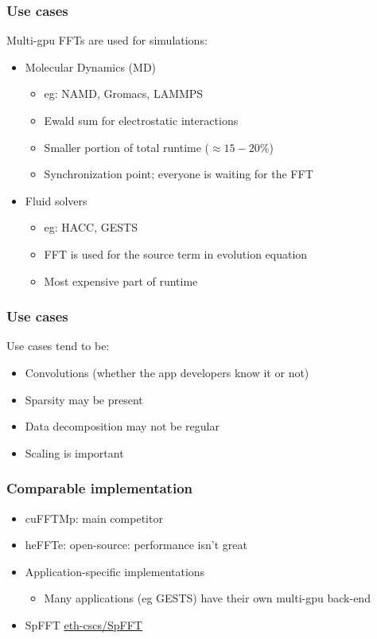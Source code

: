 \documentclass[10pt,aspectratio=169]{beamer}
\begin{document}
\begin{frame}
  \frametitle{Use cases}

  \bigskip

  Multi-gpu FFTs are used for simulations:
  \begin{itemize}
  \item Molecular Dynamics (MD)
    \begin{itemize}
    \item eg: NAMD, Gromacs, LAMMPS
    \item Ewald sum for electrostatic interactions
    \item Smaller portion of total runtime ($\approx 15-20\%$)
    \item Synchronization point; everyone is waiting for the FFT
    \end{itemize}
  \item Fluid solvers
    \begin{itemize}
    \item eg: HACC, GESTS
    \item FFT is used for the source term in evolution equation
    \item Most expensive part of runtime
    \end{itemize}
  \end{itemize}

\end{frame}

\begin{frame}
  \frametitle{Use cases}

  Use cases tend to be:
  \begin{itemize}
  \item Convolutions (whether the app developers know it or not)
  \item Sparsity may be present
  \item Data decomposition may not be regular
  \item Scaling is important
  \end{itemize}
  
\end{frame}


\begin{frame}
  \frametitle{Comparable implementation}


  \begin{itemize}
  \item cuFFTMp: main competitor
  \item heFFTe: open-source: performance isn't great
  \item Application-specific implementations
    \begin{itemize}
    \item Many applications (eg GESTS) have their own multi-gpu back-end
    \end{itemize}
  \item SpFFT \href{https://github.com/eth-cscs/SpFFT}{eth-cscs/SpFFT}
  \end{itemize}
  
\end{frame}
\end{document}
